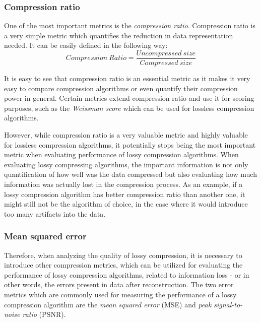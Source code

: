 \documentclass[thesis=M,english]{FITthesis}[2012/10/20]
\begin{document}
\subsubsection{Compression ratio}
One of the most important metrics is the \emph{compression ratio}.
Compression ratio is a very simple metric which quantifies the reduction
in data representation needed. It can be easily defined in the following
way:
\begin{equation}
Compression\ Ratio = \frac{Uncompressed\ size}{Compressed\ size}    
\end{equation}

It is easy to see that compression ratio is an essential metric as
it makes it very easy to compare compression algorithms or even
quantify their compression power in general. Certain metrics
extend compression ratio and use it for scoring purposes, such as
the \emph{Weissman score} which can be used for lossless compression
algorithms.

However, while compression ratio is a very valuable metric and
highly valuable for lossless compression algorithms, it potentially stops
being the most important metric when evaluating performance of lossy compression algorithms.
When evaluating lossy compressing algorithms, the important information is not
only quantification of how well was the data compressed but also
evaluating how much information was actually lost in the compression
process. As an example, if a lossy compression algorithm has better compression
ratio than another one, it might still not be the algorithm of choice,
in the case where it would introduce too many artifacts into the data.

\subsubsection{Mean squared error}
Therefore, when analyzing the quality of lossy compression,
it is necessary to introduce other compression metrics, which
can be utilized for evaluating the performance of lossy compression
algorithms, related to information loss - or in other words, the errors
present in data after reconstruction. The two error metrics which are
commonly used for measuring the performance of a lossy compression
algorithm are the \emph{mean squared error} (MSE) and \emph{peak
signal-to-noise ratio} (PSNR).\cite{imgcompintro}
\end{document}
